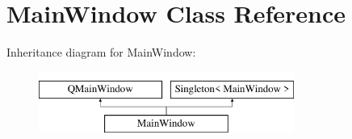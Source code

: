 \hypertarget{class_main_window}{\section{Main\-Window Class Reference}
\label{class_main_window}
}
Inheritance diagram for Main\-Window\-:\begin{figure}[H]
\begin{center}
\leavevmode
\includegraphics[height=2.000000cm]{class_main_window}
\end{center}
\end{figure}
